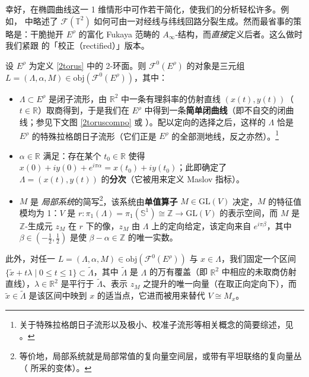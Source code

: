 幸好，在椭圆曲线这一 1 维情形中可作若干简化，使我们的分析轻松许多。例如，\cite[命题 6.31]{[Imp21]} 中略述了 $\mathscr{F}(\mathbb{T}^2)$ 如何可由一对经线与纬线回路分裂生成。然而最省事的策略是：干脆抛开 $E^\rho$ 的富化 Fukaya 范畴的 $A_\infty$-结构，而\textit{直接}定义后者。这么做时我们紧跟 \cite[第 3 节]{[Kre00]} 的「校正（rectified）」版本。

\begin{Def}\label{F0Erho}
	设 $E^\rho$ 为定义 \ref{2torus} 中的 2-环面。则 $\mathscr{F}^0(E^\rho)$ 的对象是三元组 $L=(\Lambda,\alpha, M)\in\text{obj}(\mathscr{F}^0(E^\rho))$，其中：
	\begin{itemize}[leftmargin=0.5cm]
		\renewcommand{\labelitemi}{\textendash}
		\item $\Lambda\subset E^\rho$ 是闭子流形，由 $\mathbb{R}^2$ 中一条有理斜率的仿射直线 $(x(t),y(t))$（$t\in\mathbb{R}$）取商得到，于是我们在 $E^\rho$ 中得到一条\textbf{简单闭曲线}（即不自交的闭曲线；参见下文图 \ref{2toruscompo} 或 \cite[例 6.30]{[Imp21]}）。配以定向的选择之后，这样的 $\Lambda$ 恰是 $E^\rho$ 的特殊拉格朗日子流形（它们正是 $E^\rho$ 的全部测地线，反之亦然）。\footnote{关于特殊拉格朗日子流形以及极小、校准子流形等相关概念的简要综述，见 \cite[附录 B]{[Por15]}。}

		\item $\alpha\in\mathbb{R}$ 满足：存在某个 $t_0\in\mathbb{R}$ 使得 $x(0)+iy(0)+e^{i\pi\alpha}=x(t_0)+iy(t_0)$；此即确定了 $\Lambda=(x(t),y(t))$ 的\textbf{分次}（它被用来定义 Maslov 指标）。

		\item $M$ 是 \textit{局部系统}的简写\footnote{等价地，局部系统就是局部常值的复向量空间层，或带有平坦联络的复向量丛（\cite[定义 7.23]{[Imp21]} 所采的变体）。}，该系统由\textbf{单值算子} $M\in\text{GL}(V)$ 决定，$M$ 的特征值模均为 1：$V$ 是 $r:\pi_1(\Lambda)=\pi_1(\mathbb{S}^1)\cong\mathbb{Z}\rightarrow\text{GL}(V)$ 的表示空间，而 $M$ 是 $\mathbb{Z}$-生成元 $z_M$ 在 $r$ 下的像，$z_M$ 由 $\Lambda$ 上的定向给定，该定向来自 $e^{i\pi\beta}$，其中 $\beta\in(-\frac{1}{2},\frac{1}{2})$ 是使 $\beta-\alpha\in\mathbb{Z}$ 的唯一实数。
	\end{itemize}
	此外，对任一 $L=(\Lambda,\alpha, M)\in\text{obj}(\mathscr{F}^0(E^\rho))$ 与 $x\in \Lambda$，我们固定一个区间 $\{\tilde{x}+t\lambda\mid 0\leq t\leq 1\}\subset\tilde{\Lambda}$，其中 $\tilde{\Lambda}$ 是 $\Lambda$ 的万有覆盖（即 $\mathbb{R}^2$ 中相应的未取商仿射直线），$\lambda\in\mathbb{R}^2$ 是平行于 $\tilde{\Lambda}$、表示 $z_M$ 之提升的唯一向量（在取正向定向下），而 $\tilde{x}\in\tilde{\Lambda}$ 是该区间中映到 $x$ 的适当点，它进而被用来替代 $V\cong M_x$。
\end{Def}

